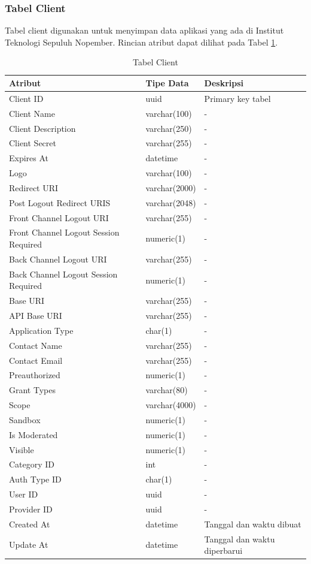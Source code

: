 \subsubsection{Tabel Client}
\par Tabel client digunakan untuk menyimpan data aplikasi yang ada di Institut Teknologi Sepuluh Nopember. Rincian atribut dapat dilihat pada Tabel \ref{tabel_client}.
\begin{longtable}{|p{2cm}|p{2.5cm}|p{4.5cm}|}
	\caption{Tabel Client} \label{tabel_client} \\ \hline
    \textbf{Atribut} & \textbf{Tipe Data} & \textbf{Deskripsi} \\ \hline
    Client ID & uuid & Primary key tabel \\ \hline
    Client Name & varchar(100) & - \\ \hline
    Client Description & varchar(250) & - \\ \hline
    Client Secret & varchar(255) & - \\ \hline
    Expires At & datetime & - \\ \hline
    Logo & varchar(100) & - \\ \hline
    Redirect URI & varchar(2000) & - \\ \hline
    Post Logout Redirect URIS & varchar(2048) & - \\ \hline
    Front Channel Logout URI & varchar(255) & - \\ \hline
    Front Channel Logout Session Required & numeric(1) & - \\ \hline
    Back Channel Logout URI & varchar(255) & - \\ \hline
    Back Channel Logout Session Required & numeric(1) & - \\ \hline
    Base URI & varchar(255) & - \\ \hline
    API Base URI & varchar(255) & - \\ \hline
    Application Type & char(1) & - \\ \hline
    Contact Name & varchar(255) & - \\ \hline
    Contact Email & varchar(255) & - \\ \hline
    Preauthorized & numeric(1) & - \\ \hline
    Grant Types & varchar(80) & - \\ \hline
    Scope & varchar(4000) & - \\ \hline
    Sandbox & numeric(1) & - \\ \hline
    Is Moderated & numeric(1) & - \\ \hline
    Visible & numeric(1) & - \\ \hline
    Category ID & int & - \\ \hline
    Auth Type ID & char(1) & - \\ \hline
    User ID & uuid & - \\ \hline
    Provider ID & uuid & - \\ \hline
    Created At & datetime & Tanggal dan waktu dibuat \\ \hline
    Update At & datetime & Tanggal dan waktu diperbarui \\ \hline
\end{longtable}

